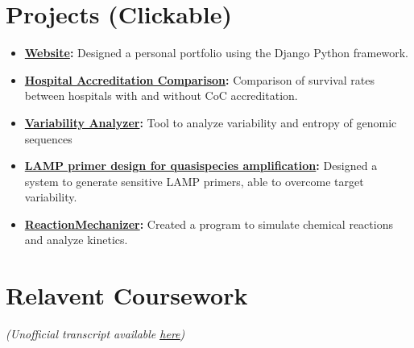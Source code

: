\documentclass[letterpaper,11pt]{article}
\newcommand{\resumeItem}[2]{
  \item\small{
    \textbf{#1}{ #2 \vspace{-2pt}}
  }
}
\newcommand{\resumeSubItem}[2]{\resumeItem{#1}{#2}\vspace{-4pt}}
\newcommand{\resumeSubHeadingListStart}{\begin{itemize}[leftmargin=*,rightmargin=\dimexpr\linewidth-0.9\textwidth-\leftmargin\relax]}
\newcommand{\resumeSubHeadingListEnd}{\end{itemize}}
\begin{document}
\section{Projects (Clickable)}
  \resumeSubHeadingListStart
    \resumeSubItem{\href{https://ahmed.science}{Website}:}
      {Designed a personal portfolio using the Django Python framework.}
    \resumeSubItem{\href{https://github.com/ArmaanAhmed22/CompareCoCversusNonCoC}{Hospital Accreditation Comparison}:}
      {Comparison of survival rates between hospitals with and without CoC accreditation.}
    \resumeSubItem{\href{https://github.com/ArmaanAhmed22/VariabilityAnalyzer}{Variability Analyzer}:}
      {Tool to analyze variability and entropy of genomic sequences}
    \resumeSubItem{\href{https://github.com/ArmaanAhmed22/NonSpecificLAMPDesign}{LAMP primer design for quasispecies amplification}:}
      {Designed a system to generate sensitive LAMP primers, able to overcome target variability.}
    \resumeSubItem{\href{https://github.com/ArmaanAhmed22/ReactionMechanizer}{ReactionMechanizer}:}
      {Created a program to simulate chemical reactions and analyze kinetics.}
  \resumeSubHeadingListEnd

%



\section{Relavent Coursework}

  \textit{(Unofficial transcript available \href{https://raw.githubusercontent.com/ArmaanAhmed22/resume/master/Transcript.pdf}{\underline{here}})}
\end{document}
